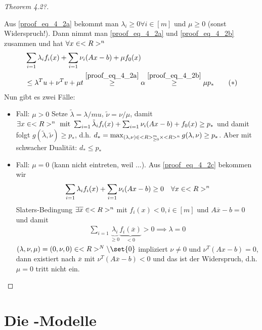 \begin{proof}[Theorem 4.2?]
\begin{itemize}
		Aus \eqref{proof_eq_4_2a} bekommt man $\lambda_i \ge 0 \forall i \in [m]$ und $\mu \ge 0$ (sonst Widerspruch!). Dann nimmt man \eqref{proof_eq_4_2a} und \eqref{proof_eq_4_2b} zusammen und hat $\forall x \in <R>^n$
		\begin{align*}
			&\sum_{i=1} \lambda_i f_i(x) + \sum_{i=1} \nu_i(Ax-b) + \mu f_0(x)\\
			&\le \lambda^T u + \nu^T v + \mu t \overset{\eqref{proof_eq_4_2a}}{\ge} \alpha \overset{\eqref{proof_eq_4_2b}}{\ge} \mu p_{\ast}\tag{$\ast$}\label{proof_eq_4_2c}
		\end{align*}
		Nun gibt es zwei Fälle:
		\begin{itemize}
			\item Fall: $\mu > 0$ Setze $\tilde{\lambda} = \lambda / mu$, $\tilde{\nu} = \nu /\mu$, damit\\
			$\exists x \in <R>^n \text{ mit } \sum_{i=1} \tilde{\lambda}_i f_i(x) + \sum_{i=1} \nu_i (Ax-b) + f_0(x) \ge p_{\ast}$ und damit folgt $g(\tilde{\lambda}, \tilde{\nu}) \ge p_{\ast}$, d.h. $d_{\ast} = \max_{(\lambda, \nu)\in <R>_{\ge 0}^m \times <R>^n} g(\lambda, \nu) \ge p_{\ast}$. Aber mit schwacher Dualität: $d_{\ast} \le p_{\ast}$
			\item Fall: $\mu = 0$ (kann nicht eintreten, weil ...). Aus \eqref{proof_eq_4_2c} bekommen wir
			\begin{align*}
				\sum_{i=1} \lambda_i f_i(x) + \sum_{i=1} \nu_i(Ax-b) \ge 0 \quad \forall x \in <R>^n
			\end{align*}
			Slaters-Bedingung $\exists \overline{x} \in \R^n$ mit $f_i(x) < 0, i \in [m]$ und $A\overline{x} - b = 0$ und damit
			\begin{align*}
				\sum_{i=1}\underbrace{\lambda_i}_{\ge 0}\underbrace{f_i(\overline{x})}_{< 0} > 0 \implies \lambda = 0
			\end{align*}
			$(\lambda, \nu, \mu) = (0, \nu, 0)\in \R^N \setminus \set{0}$ impliziert $\nu \neq 0$ und $\nu^T(Ax-b) = 0$, dann existiert nach $\overline{x}$ mit $\nu^T(A\overline{x} - b) < 0$ und das ist der Widerspruch, d.h. $\mu = 0$ tritt nicht ein.
		\end{itemize}
	\end{itemize}
\end{proof}
\section{Die -Modelle}
